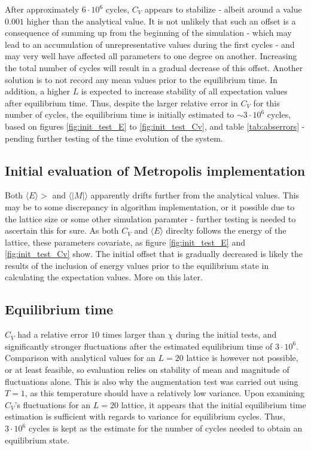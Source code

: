 \documentclass[%
oneside,                 %
final,                   %
10pt]{article}
\begin{document}
After approximately $6 \cdot 10^6$ cycles, $C_V$ appears to stabilize - albeit around a value $0.001$ higher than the analytical value. It is not unlikely that such an offset is a consequence of summing up from the beginning of the simulation - which may lead to an accumulation of unrepresentative values during the first cycles - and may very well have affected all parameters to one degree on another. Increasing the total number of cycles will result in a gradual decrease of this offset. Another solution is to not record any mean values prior to the equilibrium time. In addition, a higher $L$ is expected to increase stability of all expectation values after equilibrium time. Thus, despite the larger relative error in $C_V$ for this number of cycles, the equilibrium time is initially estimated to $\sim 3 \cdot 10^6$ cycles, based on  figures \ref{fig:init_test_E} to \ref{fig:init_test_Cv}, and table \ref{tab:abserrors} - pending further testing of the time evolution of the system.

\subsection{Initial evaluation of Metropolis implementation}
Both $\langle E \rangle>$ and $\langle |M| \rangle$ apparently drifts further from the analytical values. This may be to some discrepancy in algorithm implementation, or it possible due to the lattice size or some other simulation paramter - further testing is needed to ascertain this for sure. As both $C_V$ and $\langle E \rangle$ direclty follows the energy of the lattice, these parameters covariate, as figure \ref{fig:init_test_E} and \ref{fig:init_test_Cv} show. The initial offset that is gradually decreased is likely the results of the inclusion of energy values prior to the equilibrium state in calculating the expectation values. More on this later.

\subsection{Equilibrium time}
\label{SS:Disucssion_eqtime}
$C_V$ had a relative error $10$ times larger than $\chi$ during the initial tests, and significantly stronger fluctuations after the estimated equilibrium time of $3 \cdot 10^6$.  Comparison with analytical values for an $L=20$ lattice is however not possible, or at least feasible, so evaluation relies on stability of mean and magnitude of fluctuations alone. This is also why the augmentation test was carried out using $T=1$, as this temperature should have a relatively low variance. Upon examining $C_V$'s fluctuations for an $L=20$ lattice, it appears that the initial equilibrium time estimation is sufficient with regards to variance for equilibrium cycles.  Thus, $3 \cdot 10^6$ cycles is kept as the estimate for the number of cycles needed to obtain an equilibrium state. \newline
\end{document}
